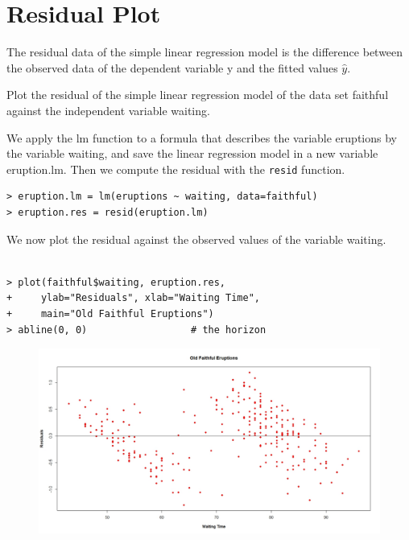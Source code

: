 \documentclass[residuals.tex]{subfiles}
\begin{document}
\section{Residual Plot}

The residual data of the simple linear regression model is the difference between the observed data of the dependent variable y and the fitted values $\hat{y}$.
 

 
Plot the residual of the simple linear regression model of the data set faithful against the independent variable waiting.
 


 
We apply the lm function to a formula that describes the variable eruptions by the variable waiting, and save the linear regression model in a new variable eruption.lm. Then we compute the residual with the \texttt{resid} function.
\newpage
 
\begin{framed}
\begin{verbatim}
> eruption.lm = lm(eruptions ~ waiting, data=faithful) 
> eruption.res = resid(eruption.lm) 
\end{verbatim}
\end{framed}

We now plot the residual against the observed values of the variable waiting. 
\begin{framed}
	\begin{verbatim}

> plot(faithful$waiting, eruption.res, 
+     ylab="Residuals", xlab="Waiting Time", 
+     main="Old Faithful Eruptions") 
> abline(0, 0)                  # the horizon 
\end{verbatim}
\end{framed}
\newpage
\begin{figure}[h!]
\centering
\includegraphics[width=0.99\linewidth]{oldfaithfulresiduals}
\caption{}
\label{fig:oldfaithfulresiduals}
\end{figure}

\end{document}
